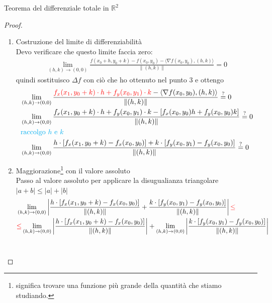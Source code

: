 \documentclass{article}  %
\begin{document}
\begin{theorem}{Teorema del differenziale totale in $\mathbb{R}^2$}
\begin{proof}
\begin{enumerate}
			\item Costruzione del limite di differenziabilità \\
			      Devo verificare che questo limite faccia zero:
			      \begin{align*}
				      \lim_{(h,k) \to (0,0)} \frac{f(x_0+h,y_0+k)-f(x_0,y_0)- \langle \nabla f(x_0,y_0), (h,k)\rangle}{\|(h,k)\|} = 0
			      \end{align*}
			      quindi sostituisco $\Delta f$ con ciò che ho ottenuto nel punto 3 e ottengo
			      \begin{align*}
				       & \lim_{(h,k) \to (0,0)} \frac{\textcolor{red}{f_x(x_1, {y_0+k}) \cdot h + f_y({x_0}, y_1) \cdot k}- \langle \nabla f(x_0,y_0), (h,k)\rangle}{\|(h,k)\|} \overset{?}{=} 0 \\
				       & \lim_{(h,k) \to (0,0)} \frac{{f_x(x_1, {y_0+k}) \cdot h + f_y({x_0}, y_1) \cdot k}- \left[f_x(x_0,y_0)h + f_y(x_0,y_0)k\right]}{\|(h,k)\|} \overset{?}{=} 0             \\
				       & \textcolor{cyan}{\text{raccolgo } h \text{ e } k}                                                                                                                       \\
				       & \lim_{(h,k) \to (0,0)} \frac{h \cdot \left[f_x(x_1,y_0+k)-f_x(x_0,y_0)\right]+k \cdot \left[f_y(x_0,y_1)-f_y(x_0,y_0)\right]}{\|(h,k)\|} \overset{?}{=} 0               \\
			      \end{align*}
			\item Maggiorazione\footnote{significa trovare una funzione più grande della quantità che stiamo studiando.} con il valore assoluto \\
			      Passo al valore assoluto per applicare la disugualianza triangolare $|a+b| \leq |a| + |b|$
			      \begin{align*}
				       & \lim_{(h,k) \to (0,0)} \left| \frac{h \cdot \left[f_x(x_1,y_0+k)-f_x(x_0,y_0)\right]}{\|(h,k)\|}
				      + \frac{k \cdot \left[f_y(x_0,y_1)-f_y(x_0,y_0)\right]}{\|(h,k)\|} \right|
				      \textcolor{red}{\leq}                                                                                                             \\
				       & \textcolor{red}{\leq} \lim_{(h,k) \to (0,0)} \left| \frac{h \cdot \left[f_x(x_1,y_0+k)-f_x(x_0,y_0)\right]}{\|(h,k)\|} \right|
				      + \lim_{(h,k) \to (0,0)} \left| \frac{k \cdot \left[f_y(x_0,y_1)-f_y(x_0,y_0)\right]}{\|(h,k)\|} \right|
			      \end{align*} \\

\end{enumerate}
\end{proof}
\end{theorem}
\end{document}
